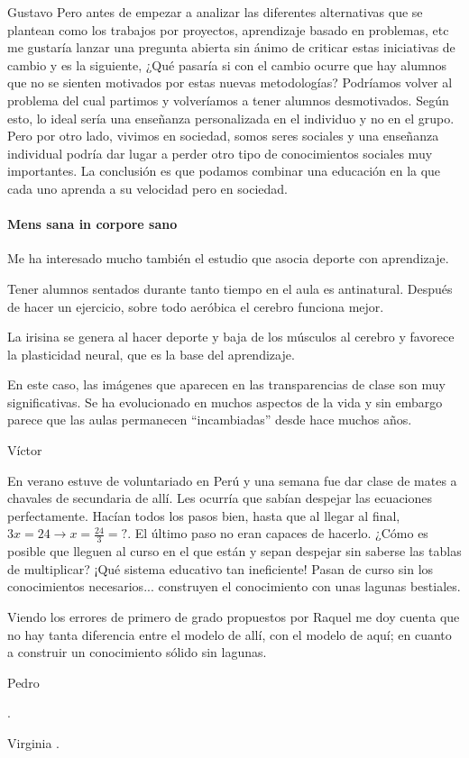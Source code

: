\begin{opin}{\guscolor}{Gustavo}
Pero antes de empezar a analizar las diferentes alternativas que se plantean como los trabajos por proyectos, aprendizaje basado en problemas, etc me gustaría lanzar una pregunta abierta sin ánimo de criticar estas iniciativas de cambio y es la siguiente, ¿Qué pasaría si con el cambio ocurre que hay alumnos que no se sienten motivados por estas nuevas metodologías? Podríamos volver al problema del cual partimos y volveríamos a tener alumnos desmotivados. Según esto, lo ideal sería una enseñanza personalizada en el individuo y no en el grupo. Pero por otro lado, vivimos en sociedad, somos seres sociales y una enseñanza individual podría dar lugar a perder otro tipo de conocimientos sociales muy importantes. La conclusión es que podamos combinar una educación en la que cada uno aprenda a su velocidad pero en sociedad.

\paragraph{Mens sana in corpore sano}
Me ha interesado mucho también el estudio que asocia deporte con aprendizaje.


Tener alumnos sentados durante tanto tiempo en el aula es antinatural. Después de hacer un ejercicio, sobre todo aeróbica el cerebro funciona mejor.


La irisina se genera al hacer deporte y baja de los músculos al cerebro y favorece la plasticidad neural, que es la base del aprendizaje.


En este caso, las imágenes que aparecen en las transparencias de clase son muy significativas. Se ha evolucionado en muchos aspectos de la vida y sin embargo parece que las aulas permanecen “incambiadas” desde hace muchos años.
\end{opin}


\begin{opin}{\victorcolor}{Víctor}

En verano estuve de voluntariado en Perú y una semana fue dar clase de mates a chavales de secundaria de allí. 
%
Les ocurría que sabían despejar las ecuaciones perfectamente. Hacían todos los pasos bien, hasta que al llegar al final, $3x = 24 \to x=\frac{24}{3} = ?$. 
%
El último paso no eran capaces de hacerlo. ¿Cómo es posible que lleguen al curso en el que están y sepan despejar sin saberse las tablas de multiplicar? 
%
¡Qué sistema educativo tan ineficiente! 
%
Pasan de curso sin los conocimientos necesarios... construyen el conocimiento con unas lagunas bestiales.

Viendo los errores de primero de grado propuestos por Raquel me doy cuenta que no hay tanta diferencia entre el modelo de allí, con el modelo de aquí; 
%
en cuanto a construir un conocimiento sólido sin lagunas.



\end{opin}

\begin{opin}{\pedrocolor}{Pedro}

.


\end{opin}

\begin{opin}{\virgicolor}{Virginia}
.


\end{opin}

